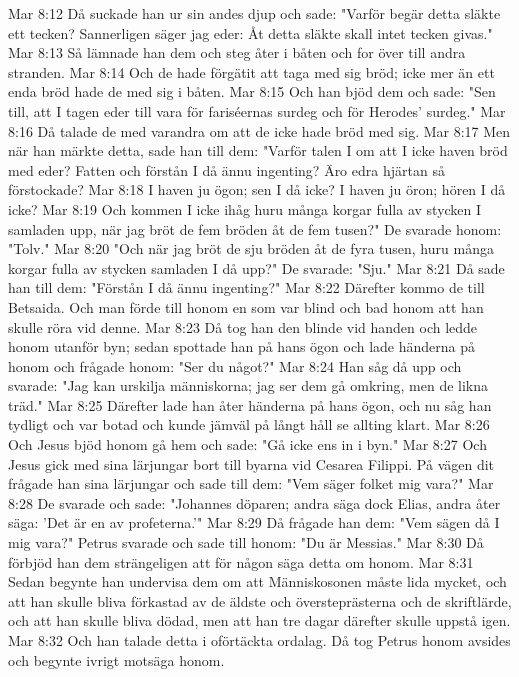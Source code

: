 Mar 8:12  Då suckade han ur sin andes djup och sade: "Varför begär detta släkte ett tecken? Sannerligen säger jag eder: Åt detta släkte skall intet tecken givas."
Mar 8:13  Så lämnade han dem och steg åter i båten och for över till andra stranden.
Mar 8:14  Och de hade förgätit att taga med sig bröd; icke mer än ett enda bröd hade de med sig i båten.
Mar 8:15  Och han bjöd dem och sade: "Sen till, att I tagen eder till vara för fariséernas surdeg och för Herodes' surdeg."
Mar 8:16  Då talade de med varandra om att de icke hade bröd med sig.
Mar 8:17  Men när han märkte detta, sade han till dem: "Varför talen I om att I icke haven bröd med eder? Fatten och förstån I då ännu ingenting? Äro edra hjärtan så förstockade?
Mar 8:18  I haven ju ögon; sen I då icke? I haven ju öron; hören I då icke?
Mar 8:19  Och kommen I icke ihåg huru många korgar fulla av stycken I samladen upp, när jag bröt de fem bröden åt de fem tusen?" De svarade honom: "Tolv."
Mar 8:20  "Och när jag bröt de sju bröden åt de fyra tusen, huru många korgar fulla av stycken samladen I då upp?" De svarade: "Sju."
Mar 8:21  Då sade han till dem: "Förstån I då ännu ingenting?"
Mar 8:22  Därefter kommo de till Betsaida. Och man förde till honom en som var blind och bad honom att han skulle röra vid denne.
Mar 8:23  Då tog han den blinde vid handen och ledde honom utanför byn; sedan spottade han på hans ögon och lade händerna på honom och frågade honom: "Ser du något?"
Mar 8:24  Han såg då upp och svarade: "Jag kan urskilja människorna; jag ser dem gå omkring, men de likna träd."
Mar 8:25  Därefter lade han åter händerna på hans ögon, och nu såg han tydligt och var botad och kunde jämväl på långt håll se allting klart.
Mar 8:26  Och Jesus bjöd honom gå hem och sade: "Gå icke ens in i byn."
Mar 8:27  Och Jesus gick med sina lärjungar bort till byarna vid Cesarea Filippi. På vägen dit frågade han sina lärjungar och sade till dem: "Vem säger folket mig vara?"
Mar 8:28  De svarade och sade: "Johannes döparen; andra säga dock Elias, andra åter säga: 'Det är en av profeterna.'"
Mar 8:29  Då frågade han dem: "Vem sägen då I mig vara?" Petrus svarade och sade till honom: "Du är Messias."
Mar 8:30  Då förbjöd han dem strängeligen att för någon säga detta om honom.
Mar 8:31  Sedan begynte han undervisa dem om att Människosonen måste lida mycket, och att han skulle bliva förkastad av de äldste och översteprästerna och de skriftlärde, och att han skulle bliva dödad, men att han tre dagar därefter skulle uppstå igen.
Mar 8:32  Och han talade detta i oförtäckta ordalag. Då tog Petrus honom avsides och begynte ivrigt motsäga honom.
